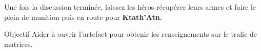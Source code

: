 \bigbreak

Une fois la discussion terminée, laissez les héros récupérer leurs armes et faire le plein de munition puis en route pour \textbf{Ktath’Atn.}

\begin{paperbox}{Objectif}
Aider  à ouvrir l’artefact pour obtenir les renseignements sur le trafic de matrices.
\end{paperbox}
